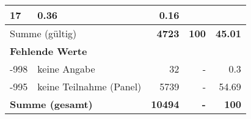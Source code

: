 \begin{longtable}{lXrrr}
       \num{17} &
       \num[round-mode=places,round-precision=2]{0,36} &
         \num[round-mode=places,round-precision=2]{0,16} \\
     \midrule
     \multicolumn{2}{l}{Summe (gültig)} &
       \textbf{\num{4723}} &
     \textbf{100} &
       \textbf{\num[round-mode=places,round-precision=2]{45,01}} \\
     \multicolumn{5}{l}{\textbf{Fehlende Werte}}\\
       -998 &
       keine Angabe &
         \num{32} &
        - &
         \num[round-mode=places,round-precision=2]{0,3} \\
       -995 &
       keine Teilnahme (Panel) &
         \num{5739} &
        - &
         \num[round-mode=places,round-precision=2]{54,69} \\
     \midrule
     \multicolumn{2}{l}{\textbf{Summe (gesamt)}} &
          \textbf{\num{10494}} &
        \textbf{-} &
        \textbf{100} \\
     \bottomrule
     \end{longtable}
     
